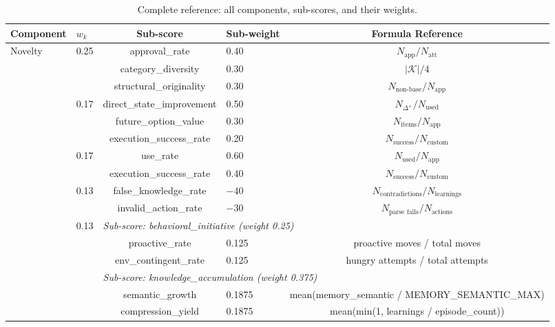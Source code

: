 \documentclass[a4paper, 11pt]{article}
\newcommand{\Natt}{N_{\text{att}}}
\newcommand{\Napp}{N_{\text{app}}}
\newcommand{\Nused}{N_{\text{used}}}
\newcommand{\Ncustom}{N_{\text{custom}}}
\newcommand{\Nsuccess}{N_{\text{success}}}
\begin{document}
\begin{table}[ht]
\centering
\caption{Complete reference: all components, sub-scores, and their weights.}
\label{tab:full_reference}
\small
\begin{tabular}{@{}llclc@{}}
\toprule
\textbf{Component} & $w_k$ & \textbf{Sub-score} & \textbf{Sub-weight} & \textbf{Formula Reference} \\
\midrule
\multirow{3}{*}{Novelty} & \multirow{3}{*}{0.25}
    & approval\_rate          & 0.40 & $\Napp / \Natt$ \\
    & & category\_diversity     & 0.30 & $|\mathcal{K}| / 4$ \\
    & & structural\_originality & 0.30 & $N_{\text{non-base}} / \Napp$ \\
\addlinespace
\multirow{3}{*}{Utility} & \multirow{3}{*}{0.17}
    & direct\_state\_improvement & 0.50 & $N_{\Delta^+} / \Nused$ \\
    & & future\_option\_value      & 0.30 & $N_{\text{items}} / \Napp$ \\
    & & execution\_success\_rate   & 0.20 & $\Nsuccess / \Ncustom$ \\
\addlinespace
\multirow{2}{*}{Realization} & \multirow{2}{*}{0.17}
    & use\_rate                & 0.60 & $\Nused / \Napp$ \\
    & & execution\_success\_rate & 0.40 & $\Nsuccess / \Ncustom$ \\
\addlinespace
\multirow{2}{*}{Stability} & \multirow{2}{*}{0.13}
    & false\_knowledge\_rate  & $-40$ & $N_{\text{contradictions}} / N_{\text{learnings}}$ \\
    & & invalid\_action\_rate   & $-30$ & $N_{\text{parse fails}} / N_{\text{actions}}$ \\
\addlinespace
\multirow{9}{*}{Autonomy} & \multirow{9}{*}{0.13}
    & \multicolumn{3}{l}{\textit{Sub-score: behavioral\_initiative (weight 0.25)}} \\
    & & \quad proactive\_rate          & 0.125  & proactive moves / total moves \\
    & & \quad env\_contingent\_rate    & 0.125  & hungry attempts / total attempts \\
    & & \multicolumn{3}{l}{\textit{Sub-score: knowledge\_accumulation (weight 0.375)}} \\
    & & \quad semantic\_growth         & 0.1875 & mean(memory\_semantic / MEMORY\_SEMANTIC\_MAX) \\
    & & \quad compression\_yield       & 0.1875 & mean(min(1, learnings / episode\_count)) \\

\end{tabular}
\end{table}
\end{document}
